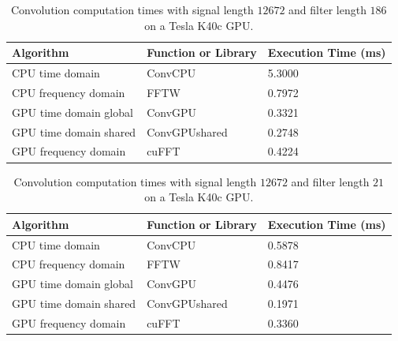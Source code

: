 \begin{table}
\caption{Convolution computation times with signal length $12672$ and filter length $186$ on a Tesla K40c GPU.}
\begin{center}
\begin{tabular}{lll}
	\toprule
	Algorithm 				& Function or Library		& Execution Time (ms) \\ \midrule
	CPU time domain 		& ConvCPU 					& 5.3000		\\
	CPU frequency domain 	& FFTW 						& 0.7972		\\
	GPU time domain global 	& ConvGPU 					& 0.3321		\\
	GPU time domain shared 	& ConvGPUshared 			& 0.2748		\\
	GPU frequency domain 	& cuFFT						& 0.4224		\\ 
	\bottomrule
\end{tabular}
\end{center}
\label{tab:CPUvsGPUtable_12672_186}
\end{table}
\begin{table}
\caption{Convolution computation times with signal length $12672$ and filter length $21$ on a Tesla K40c GPU.}
\begin{center}
\begin{tabular}{lll}
	\toprule
	Algorithm 				& Function or Library		& Execution Time (ms) \\ \midrule
	CPU time domain 		& ConvCPU 					& 0.5878		\\
	CPU frequency domain 	& FFTW 						& 0.8417		\\
	GPU time domain global 	& ConvGPU 					& 0.4476		\\
	GPU time domain shared 	& ConvGPUshared 			& 0.1971		\\
	GPU frequency domain 	& cuFFT						& 0.3360		\\ 
	\bottomrule
\end{tabular}
\end{center}
\label{tab:CPUvsGPUtable_12672_21}
\end{table}

